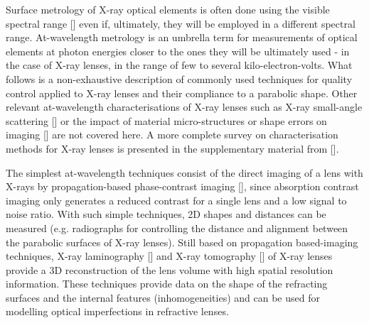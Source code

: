 \begin{refsection}
Surface metrology of X-ray optical elements is often done using the visible spectral range [\cite{Alcock2016, Vivo2019}] even if, ultimately, they will be employed in a different spectral range. At-wavelength metrology is an umbrella term for measurements of optical elements at photon energies closer to the ones they will be ultimately used - in the case of X-ray lenses, in the range of few to several kilo-electron-volts. What follows is a non-exhaustive description of commonly used techniques for quality control applied to X-ray lenses and their compliance to a parabolic shape. Other relevant at-wavelength characterisations of X-ray lenses such as X-ray small-angle scattering [\cite{Roth2014, Chubar2020}] or the impact of material micro-structures or shape errors on imaging [\cite{Chubar2020,Lyatun2020}] are not covered here. A more complete survey on characterisation methods for X-ray lenses is presented in the supplementary material from [\cite{Roth2017}].

The simplest at-wavelength techniques consist of the direct imaging of a lens with X-rays by propagation-based phase-contrast imaging [\cite{Endrizzi2018}], since absorption contrast imaging only generates a reduced contrast for a single lens and a low signal to noise ratio. With such simple techniques, 2D shapes and distances can be measured (e.g. radiographs for controlling the distance and alignment between the parabolic surfaces of X-ray lenses). Still based on propagation based-imaging techniques, X-ray laminography [\cite{Helfen2011,Roth2014}] and X-ray tomography [\cite{Landis2010,Narikovich2017}] of X-ray lenses provide a 3D reconstruction of the lens volume with high spatial resolution information. These techniques provide data on the shape of the refracting surfaces and the internal features (inhomogeneities) and can be used for modelling optical imperfections in refractive lenses. 



\end{refsection}
